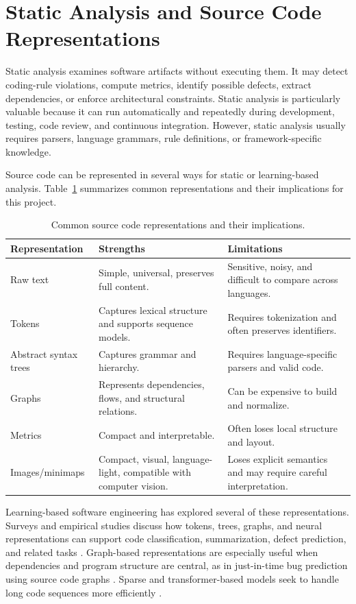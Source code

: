 \section{Static Analysis and Source Code Representations}

Static analysis examines software artifacts without executing them. It may
detect coding-rule violations, compute metrics, identify possible defects,
extract dependencies, or enforce architectural constraints. Static analysis is
particularly valuable because it can run automatically and repeatedly during
development, testing, code review, and continuous integration. However, static
analysis usually requires parsers, language grammars, rule definitions, or
framework-specific knowledge.

Source code can be represented in several ways for static or learning-based
analysis. Table~\ref{tab:foundations-representations} summarizes common
representations and their implications for this project.

\begin{table}[ht]
\centering
\caption{Common source code representations and their implications.}
\label{tab:foundations-representations}
\begin{tabular}{p{}p{}p{}}
\toprule
\textbf{Representation} & \textbf{Strengths} & \textbf{Limitations} \\
\midrule
Raw text & Simple, universal, preserves full content. & Sensitive, noisy, and difficult to compare across languages. \\
Tokens & Captures lexical structure and supports sequence models. & Requires tokenization and often preserves identifiers. \\
Abstract syntax trees & Captures grammar and hierarchy. & Requires language-specific parsers and valid code. \\
Graphs & Represents dependencies, flows, and structural relations. & Can be expensive to build and normalize. \\
Metrics & Compact and interpretable. & Often loses local structure and layout. \\
Images/minimaps & Compact, visual, language-light, compatible with computer vision. & Loses explicit semantics and may require careful interpretation. \\
\bottomrule
\end{tabular}
\fautor
\end{table}

Learning-based software engineering has explored several of these
representations. Surveys and empirical studies discuss how tokens, trees,
graphs, and neural representations can support code classification,
summarization, defect prediction, and related tasks
\cite{allamanis2018survey,alon2019code2vec,feng2020codebert,guo2021graphcodebert}.
Graph-based representations are especially useful when dependencies and program
structure are central, as in just-in-time bug prediction using source code graphs
\cite{nadim2022sourcecodegraphs}. Sparse and transformer-based models seek to
handle long code sequences more efficiently \cite{yang2025sparsecoder}.

